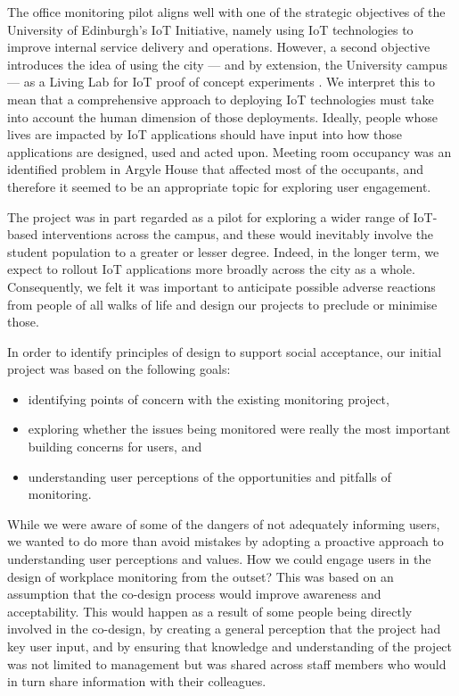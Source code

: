 The office monitoring pilot aligns well with one of the strategic objectives of the University of Edinburgh's IoT Initiative, namely using IoT technologies to improve internal service delivery and operations. However, a second objective introduces the idea of using the city --- and by extension, the University campus --- as a Living Lab for IoT proof of concept experiments \cite{IoT-Strategy}. We interpret this to mean that a comprehensive approach to deploying IoT technologies must take into account the human dimension of those deployments. Ideally, people whose lives are impacted by IoT applications should have input into how those applications are designed, used and acted upon. Meeting room occupancy was an identified problem in Argyle House that affected most of the occupants, and therefore it seemed to be an appropriate topic for exploring user engagement.

The project was in part regarded as a pilot for exploring a wider range of IoT-based interventions across the campus, and these would inevitably involve the student population to a greater or lesser degree. Indeed, in the longer term, we expect to rollout IoT applications more broadly across the city as a whole. Consequently, we felt it was important to anticipate possible adverse reactions from people of all walks of life and design our projects to preclude or minimise those. 

In order to identify principles of design to support social acceptance, our initial project was based on the following goals:
\begin{itemize}
\item identifying points of concern with the existing monitoring project,
\item exploring whether the issues being monitored were really the most important building concerns for users, and
\item understanding user perceptions of the opportunities and pitfalls of monitoring.
\end{itemize}

While we were aware of some of the dangers of not adequately informing users, we wanted to do more than avoid mistakes by adopting a proactive approach to understanding user perceptions and values. How we could engage users in the design of workplace monitoring from the outset? This was based on an assumption that the co-design process would improve awareness and acceptability. This would happen as a result of some people being directly involved in the co-design, by creating a general perception that the project had key user input, and by ensuring that knowledge and understanding of the project was not limited to management but was shared across staff members who would in turn share information with their colleagues.


